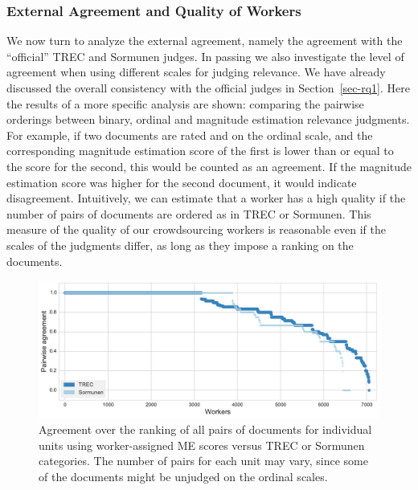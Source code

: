 \subsubsection{External Agreement and Quality of Workers}
\label{sec:external-agreement}

We now turn to analyze the external agreement, namely the agreement
with the ``official'' TREC and Sormunen judges. 
In passing we also investigate the level of agreement when using
different scales for judging relevance. 
We have already discussed the overall consistency with the official
judges in Section~\ref{sec-rq1}. 
Here the results of a more specific analysis are shown: comparing the
pairwise orderings between binary, ordinal and magnitude estimation
relevance judgments.
For example, 
if two documents are rated \nn and \mm on the ordinal scale, 
and the corresponding
magnitude estimation score of the first is lower than or equal to the
score for the second, this would be counted as an agreement.
If the
magnitude estimation score was higher for the second document, it
would indicate disagreement.
Intuitively, we can estimate that a worker has a high quality if the
number of pairs of documents are ordered as in TREC or Sormunen.
This measure of the quality of our crowdsourcing workers is reasonable
even if the scales of the judgments differ, as long as they impose a
ranking on the documents. 

\begin{figure}[tp]
  \centering
  \includegraphics[width=.9\linewidth]{figs/WorkersQuality.pdf}
  \caption{Agreement over the ranking of all pairs of documents for individual units 
    using worker-assigned ME scores versus
    TREC or Sormunen categories. The number of pairs for each
    unit may vary, since some of the documents might be unjudged on the ordinal scales.
    \label{fig:workersQuality}}
\end{figure}


